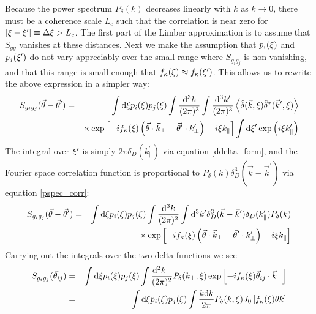 Because the power spectrum $P_\delta(k)$ decreases linearly with $k$ as 
$k\to0$, there must be a coherence scale $L_c$ such that the
correlation is near zero for 
$|\xi-\xi^\prime| \equiv \Delta\xi > L_c$.  
The first part of the Limber approximation is to assume that $S_{gg}$ vanishes
at these distances.
Next we make the assumption that $p_i(\xi)$ and 
$p_j(\xi^\prime)$ do not vary appreciably over the small range where
$S_{g_ig_j}$ is non-vanishing, and that this range is small enough that 
$f_\kappa(\xi) \approx f_\kappa(\xi^\prime)$. 
This allows us to rewrite the above expression in a simpler way:
\begin{eqnarray}
  S_{g_ig_j}(\vec\theta-\vec\theta^\prime) 
  &=& \int \mathrm{d}\xi p_i(\xi)p_j(\xi)
  \int \frac{\mathrm{d}^3k}{(2\pi)^3}\int \frac{\mathrm{d}^3k^\prime}{(2\pi)^3} 
  \left\langle\hat\delta(\vec k,\xi)
  \hat\delta^*(\vec k^\prime, \xi)
  \right\rangle\nonumber\\
  &&\times
  \exp\left[-i f_\kappa(\xi) 
    \left(\vec{\theta} \cdot \vec k_\perp 
    - \vec{\theta}^\prime \cdot k^\prime_\perp \right) 
    -i \xi k_\parallel \right]
  \int \mathrm{d}\xi^\prime\exp\left(i\xi k^\prime_\parallel\right)
\end{eqnarray}
The integral over $\xi^\prime$ is 
simply $2\pi\delta_D(k^\prime_\parallel)$
via equation \ref{ddelta_form}, and the Fourier space correlation function
is proportional to $P_\delta(k)\delta^3_D(\vec k-\vec k^\prime)$ 
via equation \ref{pspec_corr}:
\begin{eqnarray}
  S_{g_ig_j}(\vec\theta-\vec\theta^\prime) 
  &=& \int \mathrm{d}\xi p_i(\xi)p_j(\xi)
  \int \frac{\mathrm{d}^3k}{(2\pi)^2}\int \mathrm{d}^3k^\prime
  \delta_D^3(\vec k-\vec k^\prime)\delta_D(k_\parallel^\prime)P_\delta(k)\nonumber\\
  &&\times
  \exp\left[-i f_\kappa(\xi) 
    \left(\vec{\theta} \cdot \vec k_\perp 
    - \vec{\theta}^\prime \cdot k^\prime_\perp \right) 
    -i \xi k_\parallel \right]
\end{eqnarray}
Carrying out the integrals over the two delta functions we see
\begin{eqnarray}
  \label{Limber}
  S_{g_ig_j}(\vec\theta_{ij}) 
  &=& \int \mathrm{d}\xi p_i(\xi)p_j(\xi)
  \int \frac{\mathrm{d}^2k_\perp}{(2\pi)^2}
  P_\delta(k_\perp,\xi)
  \exp\left[-i f_\kappa(\xi) 
    \vec \theta_{ij} \cdot \vec k_\perp 
    \right]\\
  \label{Limber2}
  &=& \int \mathrm{d}\xi p_i(\xi)p_j(\xi)
  \int \frac{k\mathrm{d} k}{2\pi}P_\delta(k,\xi)
  J_0\left[f_\kappa(\xi)\theta k\right]
\end{eqnarray}
